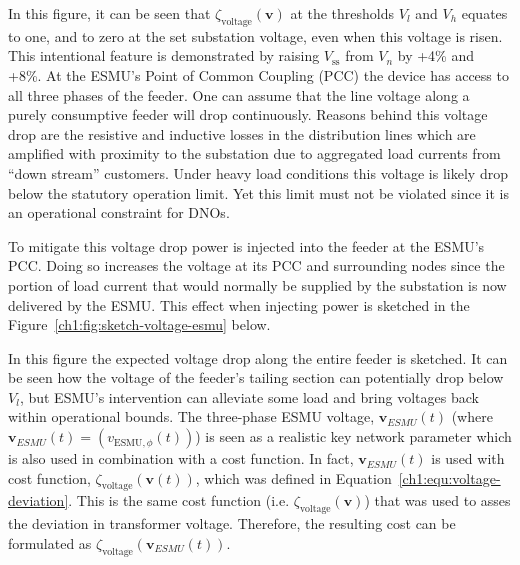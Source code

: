 

In this figure, it can be seen that $\zeta_\text{voltage}(\textbf{v})$ at the thresholds $V_l$ and $V_h$ equates to one, and to zero at the set substation voltage, even when this voltage is risen.
This intentional feature is demonstrated by raising $V_\text{ss}$ from $V_n$ by +4\% and +8\%.
At the ESMU's Point of Common Coupling (PCC) the device has access to all three phases of the feeder.
One can assume that the line voltage along a purely consumptive feeder will drop continuously.
Reasons behind this voltage drop are the resistive and inductive losses in the distribution lines which are amplified with proximity to the substation due to aggregated load currents from ``down stream'' customers.
Under heavy load conditions this voltage is likely drop below the statutory operation limit.
Yet this limit must not be violated since it is an operational constraint for DNOs.

To mitigate this voltage drop power is injected into the feeder at the ESMU's PCC.
Doing so increases the voltage at its PCC and surrounding nodes since the portion of load current that would normally be supplied by the substation is now delivered by the ESMU.
This effect when injecting power is sketched in the Figure~\ref{ch1:fig:sketch-voltage-esmu} below.




In this figure the expected voltage drop along the entire feeder is sketched. 
It can be seen how the voltage of the feeder's tailing section can potentially drop below $V_l$, but ESMU's intervention can alleviate some load and bring voltages back within operational bounds.
The three-phase ESMU voltage, $\textbf{v}_{ESMU}(t)$ (where $\textbf{v}_{ESMU}(t) = (v_{\text{ESMU},\phi}(t))$) is seen as a realistic key network parameter which is also used in combination with a cost function.
In fact, $\textbf{v}_{ESMU}(t)$ is used with cost function, $\zeta_\text{voltage}(\textbf{v}(t))$, which was defined in Equation~\ref{ch1:equ:voltage-deviation}.
This is the same cost function (i.e. $\zeta_\text{voltage}(\textbf{v})$) that was used to asses the deviation in transformer voltage.
Therefore, the resulting cost can be formulated as $\zeta_\text{voltage}(\textbf{v}_{ESMU}(t))$.

